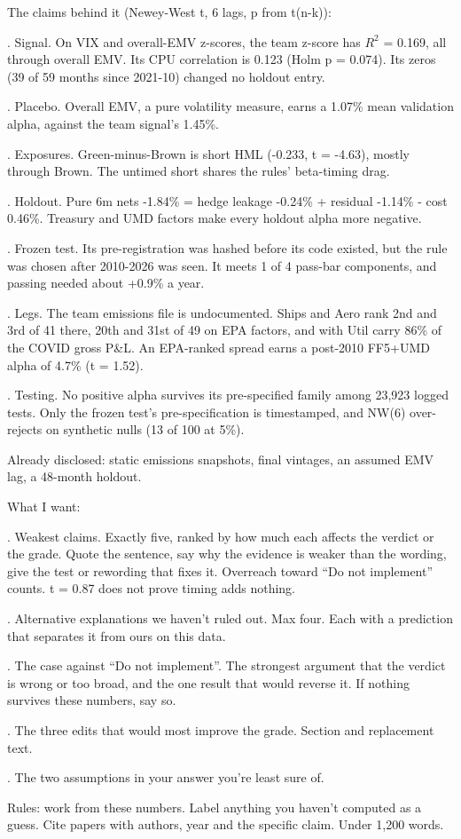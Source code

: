 \medskip
\par\noindent The claims behind it (Newey-West t, 6 lags, p from t(n-k)):
\par{}. Signal. On VIX and overall-EMV z-scores, the team z-score has $R^2$ = 0.169, all through overall EMV. Its CPU correlation is 0.123 (Holm p = 0.074). Its zeros (39 of 59 months since 2021-10) changed no holdout entry.
\par{}. Placebo. Overall EMV, a pure volatility measure, earns a 1.07\% mean validation alpha, against the team signal's 1.45\%.
\par{}. Exposures. Green-minus-Brown is short HML (-0.233, t = -4.63), mostly through Brown. The untimed short shares the rules' beta-timing drag.
\par{}. Holdout. Pure 6m nets -1.84\% = hedge leakage -0.24\% + residual -1.14\% - cost 0.46\%. Treasury and UMD factors make every holdout alpha more negative.
\par{}. Frozen test. Its pre-registration was hashed before its code existed, but the rule was chosen after 2010-2026 was seen. It meets 1 of 4 pass-bar components, and passing needed about +0.9\% a year.
\par{}. Legs. The team emissions file is undocumented. Ships and Aero rank 2nd and 3rd of 41 there, 20th and 31st of 49 on EPA factors, and with Util carry 86\% of the COVID gross P\&L. An EPA-ranked spread earns a post-2010 FF5+UMD alpha of 4.7\% (t = 1.52).
\par{}. Testing. No positive alpha survives its pre-specified family among 23,923 logged tests. Only the frozen test's pre-specification is timestamped, and NW(6) over-rejects on synthetic nulls (13 of 100 at 5\%).
\par\noindent Already disclosed: static emissions snapshots, final vintages, an assumed EMV lag, a 48-month holdout.
\medskip
\par\noindent What I want:
\par{}. Weakest claims. Exactly five, ranked by how much each affects the verdict or the grade. Quote the sentence, say why the evidence is weaker than the wording, give the test or rewording that fixes it. Overreach toward ``Do not implement'' counts. t = 0.87 does not prove timing adds nothing.
\par{}. Alternative explanations we haven't ruled out. Max four. Each with a prediction that separates it from ours on this data.
\par{}. The case against ``Do not implement''. The strongest argument that the verdict is wrong or too broad, and the one result that would reverse it. If nothing survives these numbers, say so.
\par{}. The three edits that would most improve the grade. Section and replacement text.
\par{}. The two assumptions in your answer you're least sure of.
\medskip
\par\noindent Rules: work from these numbers. Label anything you haven't computed as a guess. Cite papers with authors, year and the specific claim. Under 1,200 words.
